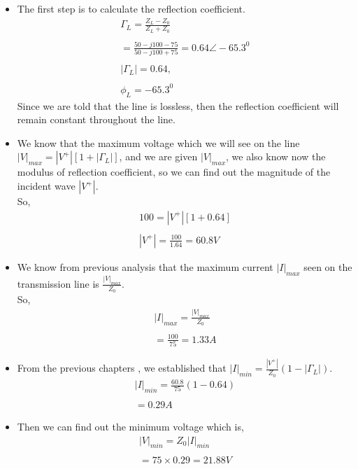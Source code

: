 \begin{itemize}
	\item 
	The first step is to calculate the reflection coefficient.
	\begin{align*}
		\Gamma_{L}=\frac{Z_{L}-Z_{0}}{Z_{L}+Z_{0}}\\\\
	=\frac{50-j100-75}{50-j100+75}=0.64\angle-65.3^{0} \\\\
	|\Gamma_{L}|=0.64,\\\\ \phi_{L}=-65.3^{0}
	\end{align*}
	Since we are told that the line is lossless, then the reflection coefficient will remain constant throughout the line.
	
	\item We know that the maximum voltage which we will see on the line $|V|_{max}=|V^{+}|[1+|\Gamma_{L}|]$, and we are given $|V|_{max}$, we also know now the modulus of reflection coefficient, so we can find out the magnitude of the incident wave $|V^+|$.\\
	So,
	\begin{align*}
	100=|V^{+}|[1+0.64]\\\\
	|V^{+}|=\frac{100}{1.64}=60.8V
	\end{align*}
	
	\item We know from previous analysis that the maximum current $|I|_{max}$ seen on the transmission line is $\frac{|V|_{max}}{Z_0}$.\\
	So,
	\begin{align*}
	 |I|_{max}=\frac{|V|_{max}}{Z_0}\\\\
	 =\frac{100}{75}=1.33A
	\end{align*}
	
	\item From the previous chapters , we established that $|I|_{min}=\frac{|V^{+}|}{Z_0}(1-|\Gamma_{L}|)$.
	\begin{align*}
	|I|_{min}=\frac{60.8}{75}(1-0.64)\\\\
	         =0.29A
	\end{align*}
	
	\item Then we can find out the minimum voltage which is,	
	\begin{align*}
	|V|_{min}=Z_0|I|_{min}\\\\
	         =75\times0.29=21.88V
	\end{align*}
	

\end{itemize}
